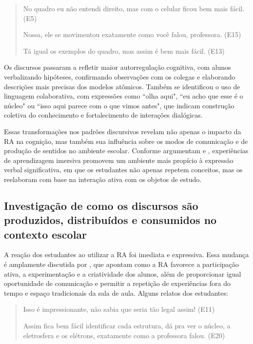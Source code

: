 \documentclass[portuguese]{textolivre}
\begin{document}
\begin{quote}
    No quadro eu não entendi direito, mas com o celular ficou bem mais fácil. (E5)
    
Nossa, ele se movimentou exatamente como você falou, professora. (E15)

Tá igual os exemplos do quadro, mas assim é bem mais fácil. (E13)
\end{quote}

Os discursos passaram a refletir maior autorregulação cognitiva, com alunos verbalizando hipóteses, confirmando observações com os colegas e elaborando descrições mais precisas dos modelos atômicos. Também se identificou o uso de linguagem colaborativa, com expressões como ``olha aqui", ``eu acho que esse é o núcleo" ou ``isso aqui parece com o que vimos antes", que indicam construção coletiva do conhecimento e fortalecimento de interações dialógicas.

Essas transformações nos padrões discursivos revelam não apenas o impacto da RA na cognição, mas também sua influência sobre os modos de comunicação e de produção de sentidos no ambiente escolar. Conforme argumentam \textcite{caberoalmenara2025} e \textcite{bacca2014}, experiências de aprendizagem imersiva promovem um ambiente mais propício à expressão verbal significativa, em que os estudantes não apenas repetem conceitos, mas os reelaboram com base na interação ativa com os objetos de estudo.

\subsection{Investigação de como os discursos são produzidos, distribuídos e consumidos no contexto escolar}
A reação dos estudantes ao utilizar a RA foi imediata e expressiva. Essa mudança é amplamente discutida por \textcite{silva2011realidade}, que apontam como a RA favorece a participação ativa, a experimentação e a criatividade dos alunos, além de proporcionar igual oportunidade de comunicação e permitir a repetição de experiências fora do tempo e espaço tradicionais da sala de aula. Alguns relatos dos estudantes:

\begin{quote}
    Isso é impressionante, não sabia que seria tão legal assim! (E11)
    
Assim fica bem fácil identificar cada estrutura, dá pra ver o núcleo, a eletrosfera e os elétrons, exatamente como a professora falou. (E20)
\end{quote}
\end{document}

